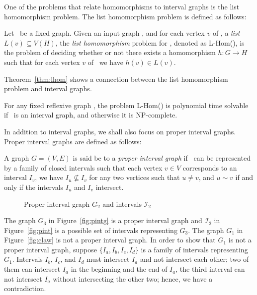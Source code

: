 One of the problems that relate homomorphisms to interval graphs is the list homomorphism problem.
The list homomorphism problem is defined as follows:

\begin{defi} [L-Hom]
Let \mH\ be a fixed graph. Given an input graph \mG, and for each vertex \(v\) of \mG,
a \emph{list} \(L(v) \subseteq V(H)\), the \emph{list homomorphism} problem for \mH, denoted
as L-Hom(\mH), is the problem of  deciding whether or not
there exists a homomorphism \(h: G\to H\) such that for each vertex \(v\) of \mG\ 
we have \(h(v)\in L(v)\)\@.
\end{defi}

Theorem~\ref{thm:lhom} shows a connection between the list homomorphism
problem and interval graphs.

\begin{theorem} [Feder and Hell 1996 \cite{listhom}] \label{thm:lhom}
For any fixed reflexive graph \mH, the problem L-Hom(\mH) is polynomial time solvable if
\mH\ is an interval graph, and otherwise it is NP-complete.
\end{theorem}

In addition to interval graphs, we shall also focus on proper interval graphs.
Proper interval graphs are defined as follows:

\begin{defi}
A graph \(G=(V,E)\) is said be to a \emph{proper interval graph} if \mG\ can
be represented by a family of closed intervals such that 
each vertex \(v \in V\) corresponds to an interval \(I_v\), 
we have \(I_u \not\subseteq I_v\) for any two vertices such that \(u \neq v\), and
\(u \sim v\) if and only if the intervals \(I_u\) and \(I_v\) intersect.
\end{defi}

\begin{figure}[h]
\center
\subfigure[\ensuremath{G_3}]{\label{fig:pintg}}\hspace{4cm}
\subfigure[\ensuremath{I_2}]{\label{fig:pint}}%
\caption{Proper interval graph \ensuremath{G_2} and intervals \ensuremath{\mathcal{I}_2}}\label{fig:pintgi}
\end{figure}

The graph \(G_3\) in Figure~\ref{fig:pintg} is a proper interval graph and
\(\mathcal{I}_2\) in Figure~\ref{fig:pint} is a possible set of intervals representing \(G_3\)\@.
The graph \(G_1\) in Figure~\ref{fig:claw} is not a proper interval graph. In order to show that
\(G_1\) is not a proper interval graph, suppose \(\{I_a, I_b, I_c, I_d\}\) is a family of intervals representing \(G_1\)\@.
Intervals \(I_b\), \(I_c\), and \(I_d\) must intersect \(I_a\) and not intersect each other; two of them can intersect \(I_a\)
in the beginning and the end of \(I_a\), the third interval can not intersect \(I_a\) without intersecting the other two; hence, we have a contradiction.

